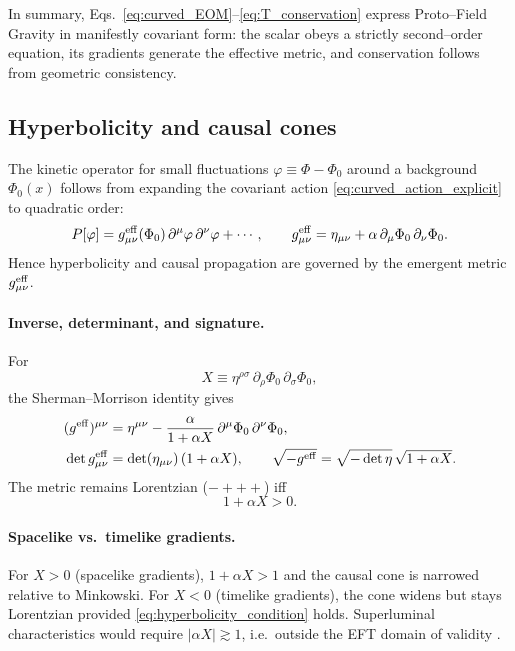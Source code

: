 \documentclass{article}
\begin{document}
In summary, Eqs.~\eqref{eq:curved_EOM}–\eqref{eq:T_conservation} express Proto–Field Gravity in manifestly covariant form: the scalar obeys a strictly second–order equation, its gradients generate the effective metric, and conservation follows from geometric consistency.

\subsection{Hyperbolicity and causal cones}

The kinetic operator for small fluctuations 
$\varphi \equiv \Phi - \Phi_{0}$ 
around a background $\Phi_{0}(x)$ follows from expanding the covariant action
\eqref{eq:curved_action_explicit} to quadratic order:
\begin{equation}
P[\varphi] = g^{\rm eff}_{\mu\nu}(\Phi_{0})\,\partial^\mu\varphi\,\partial^\nu\varphi + \cdots,
\qquad
g^{\rm eff}_{\mu\nu} = \eta_{\mu\nu} + \alpha\,\partial_\mu\Phi_{0}\,\partial_\nu\Phi_{0}.
\label{eq:fluctuation_metric}
\end{equation}
Hence hyperbolicity and causal propagation are governed by the emergent metric $g^{\rm eff}_{\mu\nu}$.

\paragraph*{Inverse, determinant, and signature.}
For
\begin{equation}
X \equiv \eta^{\rho\sigma}\,\partial_\rho\Phi_{0}\,\partial_\sigma\Phi_{0},
\label{eq:X_background}
\end{equation}
the Sherman–Morrison identity gives
\begin{align}
(g^{\rm eff})^{\mu\nu} 
&= \eta^{\mu\nu} - \frac{\alpha}{1+\alpha X}\,\partial^\mu\Phi_{0}\,\partial^\nu\Phi_{0},
\label{eq:inverse_background}\\
\det g^{\rm eff}_{\mu\nu} &= \det(\eta_{\mu\nu})\,(1+\alpha X),
\qquad
\sqrt{-g^{\rm eff}} = \sqrt{-\det\eta}\,\sqrt{1+\alpha X}.
\label{eq:det_background}
\end{align}
The metric remains Lorentzian ($-+++$) iff
\begin{equation}
1 + \alpha X > 0 .
\label{eq:hyperbolicity_condition}
\end{equation}

\paragraph*{Spacelike vs.\ timelike gradients.}
For $X>0$ (spacelike gradients), $1+\alpha X>1$ and the causal cone is narrowed relative to Minkowski.  
For $X<0$ (timelike gradients), the cone widens but stays Lorentzian provided \eqref{eq:hyperbolicity_condition} holds. Superluminal characteristics would require $|\alpha X|\gtrsim 1$, i.e.\ outside the EFT domain of validity \cite{PapalloReall2017,PoissonWill2014}.
\end{document}

